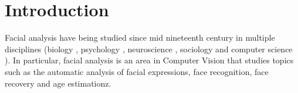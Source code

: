\chapter{Introduction} \label{chap:introduction}
Facial analysis have being studied since mid nineteenth century in multiple disciplines (biology \cite{bhl24064}, psychology \cite{ekm02}, neuroscience \cite{freiwald2009face}, sociology \cite{kemper1978social} and computer science \cite{fasel2003automatic}). In particular, facial analysis is an area in Computer Vision that studies topics such as the automatic analysis of facial expressions, face recognition, face recovery and age estimationz.


